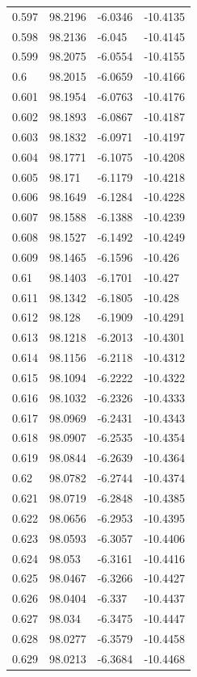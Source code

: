 \begin{tabular}{llll}
0.597 & 98.2196 & -6.0346 & -10.4135 \\
0.598 & 98.2136 & -6.045 & -10.4145 \\
0.599 & 98.2075 & -6.0554 & -10.4155 \\
0.6 & 98.2015 & -6.0659 & -10.4166 \\
0.601 & 98.1954 & -6.0763 & -10.4176 \\
0.602 & 98.1893 & -6.0867 & -10.4187 \\
0.603 & 98.1832 & -6.0971 & -10.4197 \\
0.604 & 98.1771 & -6.1075 & -10.4208 \\
0.605 & 98.171 & -6.1179 & -10.4218 \\
0.606 & 98.1649 & -6.1284 & -10.4228 \\
0.607 & 98.1588 & -6.1388 & -10.4239 \\
0.608 & 98.1527 & -6.1492 & -10.4249 \\
0.609 & 98.1465 & -6.1596 & -10.426 \\
0.61 & 98.1403 & -6.1701 & -10.427 \\
0.611 & 98.1342 & -6.1805 & -10.428 \\
0.612 & 98.128 & -6.1909 & -10.4291 \\
0.613 & 98.1218 & -6.2013 & -10.4301 \\
0.614 & 98.1156 & -6.2118 & -10.4312 \\
0.615 & 98.1094 & -6.2222 & -10.4322 \\
0.616 & 98.1032 & -6.2326 & -10.4333 \\
0.617 & 98.0969 & -6.2431 & -10.4343 \\
0.618 & 98.0907 & -6.2535 & -10.4354 \\
0.619 & 98.0844 & -6.2639 & -10.4364 \\
0.62 & 98.0782 & -6.2744 & -10.4374 \\
0.621 & 98.0719 & -6.2848 & -10.4385 \\
0.622 & 98.0656 & -6.2953 & -10.4395 \\
0.623 & 98.0593 & -6.3057 & -10.4406 \\
0.624 & 98.053 & -6.3161 & -10.4416 \\
0.625 & 98.0467 & -6.3266 & -10.4427 \\
0.626 & 98.0404 & -6.337 & -10.4437 \\
0.627 & 98.034 & -6.3475 & -10.4447 \\
0.628 & 98.0277 & -6.3579 & -10.4458 \\
0.629 & 98.0213 & -6.3684 & -10.4468 \\

\end{tabular}
